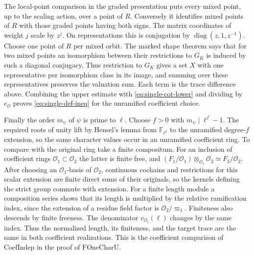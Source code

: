 The local-point comparison in the graded presentation puts every
mixed point, up to the scaling action, over a point of \(R\). Conversely
it identifies mixed points of \(R\) with those graded points having
both signs. The matrix coordinates of weight \(j\) scale by \(z^j\). On representations this is conjugation by
\(\operatorname{diag}(z,1,z^{-1})\). Choose one point of \(R\) per
mixed orbit. The marked shape theorem says that for two mixed points
an isomorphism between their restrictions to \(G_K\) is induced by
such a diagonal conjugacy. Thus restriction to \(G_K\) gives a set
\(X\) with one representative per isomorphism class in its image,
and summing over these representatives preserves the valuation
sum. Each term is the trace difference above. Combining the upper
estimate with \eqref{eq:single-cot-lower} and dividing by
\(e_\mathcal O\) proves \eqref{eq:single-def-ineq} for the
unramified coefficient choice.

Finally the order \(m_\psi\) of \(\psi\) is prime to \(\ell\).
Choose \(f>0\) with \(m_\psi\mid\ell^f-1\). The required roots
of unity lift by Hensel's lemma from \(\mathbb F_{\ell^f}\) to
the unramified degree-\(f\) extension, so the same character values
occur in an unramified coefficient ring. To compare with the original
ring take a finite compositum. For an inclusion of coefficient rings
\(\mathcal O_1\subset\mathcal O_2\) the latter is finite free, and
\((F_1/\mathcal O_1)\otimes_{\mathcal O_1}\mathcal O_2
 \simeq F_2/\mathcal O_2\).
After choosing an \(\mathcal O_1\)-basis of \(\mathcal O_2\),
continuous cochains and restrictions for this scalar extension are
finite direct sums of their originals, so the kernels defining
the strict group commute with extension. For a finite length
module a composition series shows that its length is multiplied by
the relative ramification index, since the extension of a residue
field factor is \(\mathcal O_2/\varpi_1\). Finiteness also descends
by finite freeness. The denominator \(v_{\mathcal O_i}(\ell)\)
changes by the same index. Thus the normalized length, its finiteness,
and the target trace are the same in both coefficient realizations.
This is the coefficient comparison of \(\mathrm{CoefIndep}\) in the
proof of \(\mathrm{FOneCharU}\).
